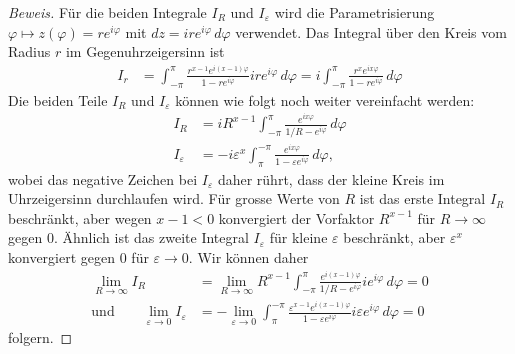 \begin{proof}[Beweis]
Für die beiden Integrale $I_R$ und $I_\varepsilon$ wird die Parametrisierung
$\varphi\mapsto z(\varphi) = re^{i\varphi}$ mit $dz=ire^{i\varphi}\,d\varphi$
verwendet.
Das Integral über den Kreis vom Radius $r$ im Gegenuhrzeigersinn ist
\begin{align*}
I_r
&=
\int_{-\pi}^\pi
\frac{r^{x-1}e^{i(x-1)\varphi}}{1-re^{i\varphi}} ire^{i\varphi}\,d\varphi
=
i\int_{-\pi}^\pi
\frac{r^xe^{ix\varphi}}{1-re^{i\varphi}}
\,d\varphi
\end{align*}
Die beiden Teile $I_R$ und $I_\varepsilon$ können wie folgt noch
weiter vereinfacht werden:
\begin{align*}
I_R
&=
iR^{x-1}
\int_{-\pi}^\pi
\frac{e^{ix\varphi}}{1/R-e^{i\varphi}}
\,d\varphi
\\
I_{\varepsilon}
&=
-
i
\varepsilon^x
\int_{\pi}^{-\pi}
\frac{e^{ix\varphi}}{1-\varepsilon e^{i\varphi}}
\,d\varphi,
\end{align*}
wobei das negative Zeichen bei $I_\varepsilon$ daher rührt, dass der
kleine Kreis im Uhrzeigersinn durchlaufen wird.
Für grosse Werte von $R$ ist das erste Integral $I_R$ beschränkt, aber wegen
$x-1<0$ konvergiert der Vorfaktor $R^{x-1}$ für $R\to\infty$ gegen 0.
Ähnlich ist das zweite Integral $I_\varepsilon$ für kleine $\varepsilon$
beschränkt, aber $\varepsilon^x$ konvergiert gegen $0$ für  $\varepsilon\to 0$.
Wir können daher
\begin{align*}
\lim_{R\to\infty}
I_R
&=
\lim_{R\to\infty}
R^{x-1}
\int_{-\pi}^\pi
\frac{e^{i(x-1)\varphi}}{1/R-e^{i\varphi}}
ie^{i\varphi}
\,d\varphi
=0
\\
\text{und}
\qquad
\lim_{\varepsilon\to 0}
I_\varepsilon
&=
-
\lim_{\varepsilon\to 0}
\int_{\pi}^{-\pi}
\frac{\varepsilon^{x-1}e^{i(x-1)\varphi}}{1-\varepsilon e^{i\varphi}}
i\varepsilon e^{i\varphi}
\,d\varphi
=
0
\end{align*}
folgern.


\end{proof}
